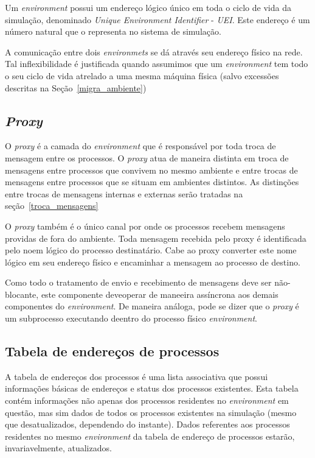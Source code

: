 Um \textit{environment} possui um endereço lógico único em toda o ciclo de vida da simulação, denominado \textit{Unique Environment Identifier} - \textit{UEI}. Este endereço é um número natural que o representa no sistema de simulação.

A comunicação entre dois \textit{environmets} se dá através seu endereço físico na rede. Tal inflexibilidade é justificada quando assumimos que um \textit{environment} tem todo o seu ciclo de vida atrelado a uma mesma máquina física (salvo excessões descritas na Seção~\ref{migra_ambiente})

\subsection{\textit{Proxy}}

O \textit{proxy} é a camada do \textit{environment} que é responsável por toda troca de mensagem entre os processos. O \textit{proxy} atua de maneira distinta em troca de mensagens entre processos que convivem no mesmo ambiente e entre trocas de mensagens entre processos que se situam em ambientes distintos. As distinções entre trocas de mensagens internas e externas serão tratadas na seção~\ref{troca_mensagens}

O \textit{proxy} também é o único canal por onde os processos recebem mensagens providas de fora do ambiente. Toda mensagem recebida pelo proxy é identificada pelo noem lógico do processo destinatário. Cabe ao proxy converter este nome lógico em seu endereço físico e encaminhar a mensagem ao processo de destino.

Como todo o tratamento de envio e recebimento de mensagens deve ser não-blocante, este componente deveoperar de maneeira assíncrona aos demais componentes do \textit{environment}. De maneira análoga, pode se dizer que o \textit{proxy} é um subprocesso executando deentro do processo físico \textit{environment}.

\subsection{Tabela de endereços de processos}

A tabela de endereços dos processos é uma lista associativa que possui informações básicas de endereços e status dos processos existentes. Esta tabela contém informações não apenas dos processos residentes no \textit{environment} em questão, mas sim dados de todos os processos existentes na simulação (mesmo que desatualizados, dependendo do instante). Dados referentes aos processos residentes no mesmo \textit{environment} da tabela de endereço de processos estarão, invariavelmente, atualizados.

